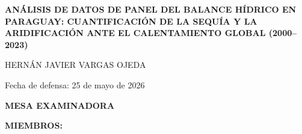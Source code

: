 \documentclass[12pt,a4paper,oneside]{book}
\begin{document}
\newpage
\thispagestyle{fancy} %
\setcounter{page}{2}  %

\begin{center}
    {\fontsize{13pt}{16pt}\selectfont \textbf{ANÁLISIS DE DATOS DE PANEL DEL BALANCE HÍDRICO EN PARAGUAY: CUANTIFICACIÓN DE LA SEQUÍA Y LA ARIDIFICACIÓN ANTE EL CALENTAMIENTO GLOBAL (2000–2023)}\par}
    
    \vspace{0.4cm}
    
    {\fontsize{12pt}{15pt}\selectfont HERNÁN JAVIER VARGAS OJEDA\par}
\end{center}

\vspace{0.3cm}


\vspace{0.25cm}

\begin{center}
    {\fontsize{12pt}{15pt}\selectfont Fecha de defensa: 25 de mayo de 2026\par}
\end{center}

\vspace{0.4cm}

\begingroup
\setlength{\parindent}{0pt}
\fontsize{12pt}{15pt}\selectfont

\textbf{MESA EXAMINADORA}\par
\vspace{0.1cm}
\textbf{MIEMBROS:}\par
\vspace{0.35cm}
\end{document}
